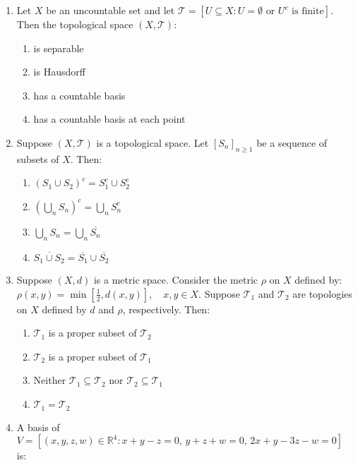 \documentclass[journal]{IEEEtran}
\newcommand{\brak}[1]{\left( #1 \right)}
\newcommand{\sbrak}[1]{\left[ #1 \right]}
\begin{document}
\begin{enumerate}
  \item Let $X$ be an uncountable set and let $\mathscr{T} = \sbrak{ U \subseteq X : U = \emptyset \text{ or } U^c \text{ is finite} }$. Then the topological space $\brak{X, \mathscr{T}}$:

    \begin{enumerate}
        \item is separable
        \item is Hausdorff
        \item has a countable basis
        \item has a countable basis at each point
    \end{enumerate}

  \item Suppose $\brak{X, \mathscr{T}}$ is a topological space. Let $\sbrak{S_n}_{n \geq 1}$ be a sequence of subsets of $X$. Then:

     \begin{enumerate}
        \item $\brak{S_1 \cup S_2}^c = S_1^c \cup S_2^c$
        \item $\brak{ \bigcup_n S_n }^c = \bigcup_n S_n^c$
        \item $\bigcup_n S_n = \bigcup_n \overline{S_n}$
        \item $\overline{S_1 \cup S_2} = \overline{S_1} \cup \overline{S_2}$
    \end{enumerate}
  
  \item Suppose $\brak{X, d}$ is a metric space. Consider the metric $\rho$ on $X$ defined by:
    $
    \rho\brak{x, y} = \min\sbrak{ \frac{1}{2}, d\brak{x, y} }, \quad x, y \in X.
    $
    Suppose $\mathscr{T}_1$ and $\mathscr{T}_2$ are topologies on $X$ defined by $d$ and $\rho$, respectively. Then:

    \begin{enumerate}
        \item $\mathscr{T}_1$ is a proper subset of $\mathscr{T}_2$
        \item $\mathscr{T}_2$ is a proper subset of $\mathscr{T}_1$
        \item Neither $\mathscr{T}_1 \subseteq \mathscr{T}_2$ nor $\mathscr{T}_2 \subseteq \mathscr{T}_1$
        \item $\mathscr{T}_1 = \mathscr{T}_2$
    \end{enumerate}

  \item A basis of $V = \sbrak{\brak{x, y, z, w} \in \mathbb{R}^4 : x + y - z = 0, \, y + z + w = 0, \, 2x + y - 3z - w = 0 }$ is:


\end{enumerate}
\end{document}
